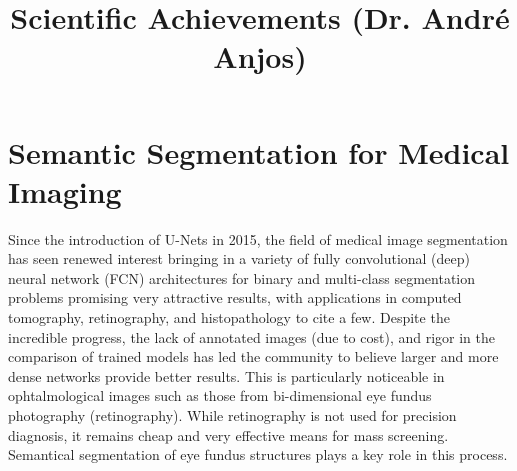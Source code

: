 \documentclass[a4paper,10pt,onecolumn]{article}
\author{}
\date{}
\begin{document}


\title{Scientific Achievements (Dr. André Anjos)}
\maketitle

\section{Semantic Segmentation for Medical Imaging}

Since the introduction of U-Nets in 2015, the field of medical image
segmentation has seen renewed interest bringing in a variety of fully
convolutional (deep) neural network (FCN) architectures for binary and
multi-class segmentation problems promising very attractive results, with
applications in computed tomography, retinography, and histopathology to cite a
few.  Despite the incredible progress, the lack of annotated images (due to
cost), and rigor in the comparison of trained models has led the community to
believe larger and more dense networks provide better results.  This is
particularly noticeable in ophtalmological images such as those from
bi-dimensional eye fundus photography (retinography).  While retinography is
not used for precision diagnosis, it remains cheap and very effective means for
mass screening.  Semantical segmentation of eye fundus structures plays a key
role in this process.
\end{document}
